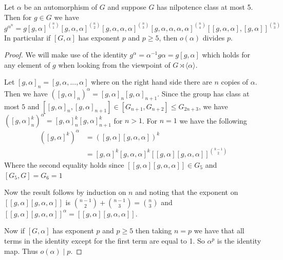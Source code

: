 \documentclass[10pt,a4paper]{amsart}
\newcommand{\paren}[1]{\left({#1}\right)}
\begin{document}
        \begin{lemma}
            Let $\alpha$ be an automorphism of $G$ and suppose $G$ has nilpotence class at most 5. Then for $g\in G$ we have
            \[
                g^{\alpha^n}=g[g,\alpha]^{\binom{n}{1}}[g,\alpha,\alpha]^{\binom{n}{2}} [g,\alpha,\alpha,\alpha]^{\binom{n}{3}} [g,\alpha,\alpha,\alpha,\alpha]^{\binom{n}{4}} [[g,\alpha,\alpha],[g,\alpha]]^{\binom{n}{3}}
            \]  
            In particular if $[G,\alpha]$ has exponent $p$ and $p\geq 5$, then $o(\alpha)$ divides $p$.
        \end{lemma}

        \begin{proof}
            




            We will make use of the identity $g^{\alpha}=\alpha^{-1}g\alpha=g[g,\alpha]$ which holds for any element of $g$ when looking from the viewpoint of $G\rtimes \langle \alpha \rangle$.

            Let $[g,\alpha]_n=[g,\alpha,...,\alpha]$ where on the right hand side there are $n$ copies of $\alpha$. Then we have $([g,\alpha]_n)^{\alpha}=[g,\alpha]_n[g,\alpha]_{n+1}$. Since the group has class at most $5$ and $[[g,\alpha]_n,[g,\alpha]_{n+1}]\in [G_{n+1},G_{n+2}]\leq G_{2n+3}$, we have $([g,\alpha]_n^k)^{\alpha}=[g,\alpha]_n^k[g,\alpha]_{n+1}^k$ for $n>1$. For $n=1$ we have the following
            \begin{align*}
                ([g,\alpha]^k)^\alpha&=\paren{[g,\alpha][g,\alpha,\alpha]}^k\\
                &=[g,\alpha]^k[g,\alpha,\alpha]^k[[g,\alpha][g,\alpha,\alpha]]^{\binom{k-1}{2}}
            \end{align*}
            Where the second equality holds since $[[g,\alpha][g,\alpha,\alpha]]\in G_5$ and $[G_5,G]=G_6=1$

            Now the result follows by induction on $n$ and noting that the exponent on $[[g,\alpha][g,\alpha,\alpha]]$ is $\binom{n-1}{2}+\binom{n-1}{3}=\binom{n}{3}$ and $[[g,\alpha][g,\alpha,\alpha]]^{\alpha}=[[g,\alpha][g,\alpha,\alpha]]$.
            

            Now if $[G,\alpha]$ has exponent $p$ and $p\geq 5$ then taking $n=p$ we have that all terms in the identity  except for the first term are equal to 1. So $\alpha^p$ is the identity map. Thus $o(\alpha)\mid p$. 
        \end{proof}
\end{document}
